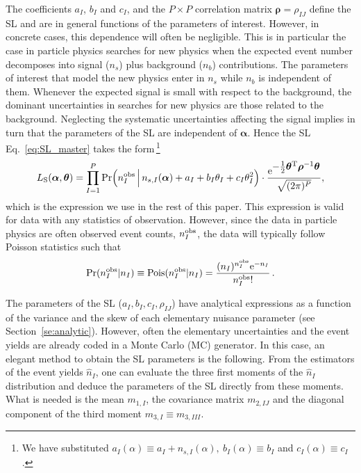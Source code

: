 \documentclass[11pt]{article}
\newcommand{\be}{\begin{equation}}
\newcommand{\ee}{\end{equation}}
\begin{document}
The coefficients $a_I$, $b_I$ and $c_I$, and the $P\times P$ correlation matrix $\bm{\rho}=\rho_{IJ}$ define the SL and are in general functions of the parameters of interest. However, in concrete cases, this dependence will often be negligible. This is in particular the case in particle physics searches for new physics when the expected event number decomposes into signal ($n_s$) plus background ($n_b$) contributions. The parameters of interest that model the new physics enter in $n_s$ while $n_b$ is independent of them.  Whenever the expected signal is small with respect to the background, the dominant uncertainties in searches for new physics are those related to the background.
Neglecting the systematic uncertainties affecting the signal implies in turn that the parameters of the SL are independent of $\bm \alpha$. Hence the SL Eq.~\eqref{eq:SL_master} takes the form\,\footnote{We have substituted
$a_I(\alpha) \equiv a_I+n_{s,I}(\alpha),~b_I(\alpha) \equiv b_I$ and $c_I(\alpha)\equiv c_I$.}
\begin{equation}
 L_{\rm{S}}(\bm{\alpha},\bm{\theta})=
\prod_{I=1}^P \mathrm{Pr}\Big( n^{\rm obs}_I \, \Big| \, n_{s,I}(\bm{\alpha})+a_I+ b_I\theta_I+c_I\theta_I^2  \Big) \cdot
\frac{ \mathrm{e}^{ \textstyle-\frac{1}{2}\bm{\theta}^\mathrm{T} \bm{\rho}^{-1} \bm{\theta} }}{\sqrt{(2\pi)^P}},
\label{eq:SL_LHC}
\end{equation}
which is the expression we use in the rest of this paper. This expression is valid for data with any statistics of observation. However, since the data in particle physics are often observed event counts, $n_{I}^{\rm{obs}}$, the data will typically follow Poisson statistics such that
\be
\textrm{Pr}(n^{\rm obs}_{I}|n_{I})\equiv \textrm{Pois}({n}^{\rm{obs}}_{I}|n_{I}) = \dfrac{(n_{I})^{{n}^{\rm{obs}}_{I}} \mathrm{e}^{-n_{I}}}{{n}^{\rm{obs}}_{I}!} \, .
\ee

The parameters of the SL ($a_I, b_I, c_I, \rho_{IJ}$) have analytical expressions
as a function of the variance and the skew  of each elementary nuisance parameter (see Section~\ref{se:analytic}). However, often the elementary uncertainties and the event yields are already coded in a Monte Carlo (MC) generator. In this case, an elegant method to obtain the SL parameters  is the following. From the estimators of the event yields $\hat n_I$, one can evaluate the three first moments of the $\hat n_I$ distribution and deduce the parameters of the SL directly from these moments.
What is needed is the mean $m_{1,I}$, the covariance matrix $m_{2,IJ}$ and the diagonal component of the third moment $m_{3,I} \equiv m_{3,III}$. 
\end{document}
